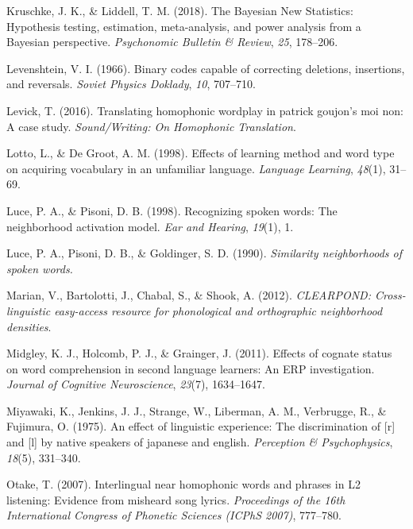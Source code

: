 \documentclass[
]{article}
\newlength{\cslhangindent}
\newenvironment{CSLReferences}[2] %
 {\begin{list}{}{%
  \setlength{\itemindent}{0pt}
  \setlength{\leftmargin}{0pt}
  \setlength{\parsep}{0pt}
  \ifodd #1
   \setlength{\leftmargin}{\cslhangindent}
   \setlength{\itemindent}{-1\cslhangindent}
  \fi
  \setlength{\itemsep}{#2\baselineskip}}}
 {\end{list}}
\begin{document}
\begin{CSLReferences}{1}{0}
Kruschke, J. K., \& Liddell, T. M. (2018). The {Bayesian New
Statistics}: {Hypothesis} testing, estimation, meta-analysis, and power
analysis from a {Bayesian} perspective. \emph{Psychonomic Bulletin \&
Review}, \emph{25}, 178--206.

Levenshtein, V. I. (1966). Binary codes capable of correcting deletions,
insertions, and reversals. \emph{Soviet Physics Doklady}, \emph{10},
707--710.

Levick, T. (2016). Translating homophonic wordplay in patrick goujon's
moi non: A case study. \emph{Sound/Writing: On Homophonic Translation}.

Lotto, L., \& De Groot, A. M. (1998). Effects of learning method and
word type on acquiring vocabulary in an unfamiliar language.
\emph{Language Learning}, \emph{48}(1), 31--69.

Luce, P. A., \& Pisoni, D. B. (1998). Recognizing spoken words: {The}
neighborhood activation model. \emph{Ear and Hearing}, \emph{19}(1), 1.

Luce, P. A., Pisoni, D. B., \& Goldinger, S. D. (1990). \emph{Similarity
neighborhoods of spoken words.}

Marian, V., Bartolotti, J., Chabal, S., \& Shook, A. (2012).
\emph{{CLEARPOND}: {Cross-linguistic} easy-access resource for
phonological and orthographic neighborhood densities}.

Midgley, K. J., Holcomb, P. J., \& Grainger, J. (2011). Effects of
cognate status on word comprehension in second language learners: {An
ERP} investigation. \emph{Journal of Cognitive Neuroscience},
\emph{23}(7), 1634--1647.

Miyawaki, K., Jenkins, J. J., Strange, W., Liberman, A. M., Verbrugge,
R., \& Fujimura, O. (1975). An effect of linguistic experience: The
discrimination of {[}r{]} and {[}l{]} by native speakers of japanese and
english. \emph{Perception \& Psychophysics}, \emph{18}(5), 331--340.

Otake, T. (2007). Interlingual near homophonic words and phrases in L2
listening: Evidence from misheard song lyrics. \emph{Proceedings of the
16th International Congress of Phonetic Sciences (ICPhS 2007)},
777--780.


\end{CSLReferences}
\end{document}
